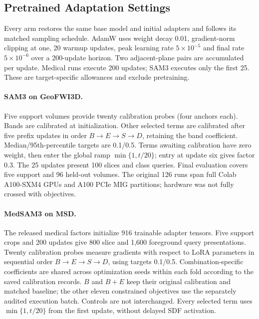 \documentclass[12pt,a4paper]{article}
\begin{document}
\subsection{Pretrained Adaptation Settings}
\label{sec:adaptation-implementation}

Every arm restores the same base model and initial adapters and follows
its matched sampling schedule. AdamW uses weight decay 0.01,
gradient-norm clipping at one, 20 warmup updates, peak learning rate
$5\times10^{-5}$ and final rate $5\times10^{-6}$ over a 200-update
horizon. Two adjacent-plane pairs are accumulated per update.
Medical runs execute 200 updates; SAM3 executes only the first 25.
These are target-specific allowances and exclude pretraining.

\paragraph{SAM3 on GeoFWI3D.}\label{sec:sam3-methods-details}
Five support volumes provide twenty calibration probes (four anchors
each). Bands are calibrated at initialization. Other selected terms
are calibrated after five prefix updates in order $B\to E\to S\to D$,
retaining the band coefficient. Median/95th-percentile targets are
0.1/0.5. Terms awaiting calibration have zero weight, then enter the
global ramp $\min\{1,t/20\}$; entry at update six gives factor 0.3.
The 25 updates present 100 slices and class queries. Final evaluation
covers five support and 96 held-out volumes. The original 126 runs
span full Colab A100-SXM4 GPUs and A100 PCIe MIG partitions;
hardware was not fully crossed with objectives.

\paragraph{MedSAM3 on MSD.}\label{sec:medsam-methods-details}
The released medical factors initialize 916 trainable adapter tensors.
Five support crops and 200 updates give 800 slice and 1,600 foreground
query presentations. Twenty calibration probes measure gradients with
respect to LoRA parameters in sequential order $B\to E\to S\to D$,
using targets 0.1/0.5. Combination-specific coefficients are shared
across optimization seeds within each fold according to the saved
calibration records. $B$ and $B+E$ keep their original calibration and
matched baseline; the other eleven constrained objectives use the
separately audited execution batch. Controls are not interchanged.
Every selected term uses $\min\{1,t/20\}$ from the first update,
without delayed SDF activation.
\end{document}
